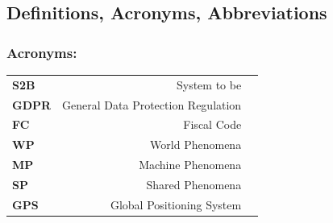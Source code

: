 \documentclass[titlepage]{article}
\begin{document}
\subsection{Definitions, Acronyms, Abbreviations}




\subsubsection{Acronyms:}

\begin{tabular}{|l|rl|}
\hline

\textbf{S2B}	& System to be 	&				 			 \\
\textbf{GDPR}	& General Data Protection Regulation &	     \\
\textbf{FC}     & Fiscal Code    	&	 				 \\
\textbf{WP}     & World Phenomena       &	 				 \\
\textbf{MP}     & Machine Phenomena     &	 				 \\
\textbf{SP}     & Shared Phenomena      &     				 \\
\textbf{GPS}    & Global Positioning System &	 			 \\

\hline
\end{tabular}
\end{document}
